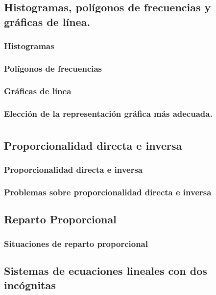 \documentclass[11pt]{book}
\begin{document}
\section{Histogramas, polígonos de frecuencias y gráficas de línea.}
\subsection{Histogramas}
\subsection{Polígonos de frecuencias}
\subsection{Gráficas de línea}
\subsection{Elección de la representación gráfica más adecuada.}

\chapter{}

\section{Proporcionalidad directa e inversa}
\subsection{Proporcionalidad directa e inversa}
\subsection{Problemas sobre proporcionalidad directa e inversa}

\section{Reparto Proporcional}
\subsection{Situaciones de reparto proporcional}

\section{Sistemas de ecuaciones lineales con dos inc\'ognitas}
\end{document}
